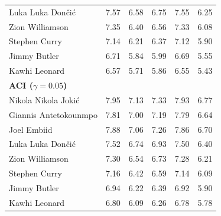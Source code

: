 \documentclass[11pt,a4paper]{article}
\begin{document}
\begin{table}[H]
\begin{tabular}{lccccc}
Luka Luka Don\v{c}i\'{c} & 7.57 & 6.58 & 6.75 & 7.55 & 6.25 \\
Zion Williamson & 7.35 & 6.40 & 6.56 & 7.33 & 6.08 \\
Stephen Curry & 7.14 & 6.21 & 6.37 & 7.12 & 5.90 \\
Jimmy Butler & 6.71 & 5.84 & 5.99 & 6.69 & 5.55 \\
Kawhi Leonard & 6.57 & 5.71 & 5.86 & 6.55 & 5.43 \\
\midrule
\multicolumn{6}{l}{\textbf{ACI ($\gamma=0.05$)}} \\
\midrule
Nikola Nikola Joki\'{c} & 7.95 & 7.13 & 7.33 & 7.93 & 6.77 \\
Giannis Antetokounmpo & 7.81 & 7.00 & 7.19 & 7.79 & 6.64 \\
Joel Embiid & 7.88 & 7.06 & 7.26 & 7.86 & 6.70 \\
Luka Luka Don\v{c}i\'{c} & 7.52 & 6.74 & 6.93 & 7.50 & 6.40 \\
Zion Williamson & 7.30 & 6.54 & 6.73 & 7.28 & 6.21 \\
Stephen Curry & 7.16 & 6.42 & 6.59 & 7.14 & 6.09 \\
Jimmy Butler & 6.94 & 6.22 & 6.39 & 6.92 & 5.90 \\
Kawhi Leonard & 6.80 & 6.09 & 6.26 & 6.78 & 5.78 \\
\bottomrule
\end{tabular}
\end{table}
\end{document}
